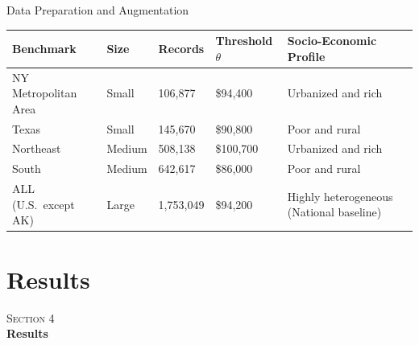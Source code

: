 \documentclass[10pt,aspectratio=169]{beamer}
\begin{document}
\begin{frame}{Data Preparation and Augmentation}
  \centering
  \small
  \begin{tabular}{@{}lllll@{}}
    \toprule
    \textbf{Benchmark} & \textbf{Size} & \textbf{Records} & \textbf{Threshold $\theta$} & \textbf{Socio-Economic Profile} \\
    \midrule
    NY Metropolitan Area   & Small  & 106,877   & \$94{,}400   & Urbanized and rich \\
    Texas                  & Small  & 145,670   & \$90{,}800   & Poor and rural \\
    Northeast              & Medium & 508,138   & \$100{,}700  & Urbanized and rich \\
    South                  & Medium & 642,617   & \$86{,}000   & Poor and rural \\
    ALL (U.S.\ except AK)  & Large  & 1,753,049 & \$94{,}200   & Highly heterogeneous (National baseline) \\
    \bottomrule
  \end{tabular}
\end{frame}

\section{Results}

{
\begin{frame}[plain]
  \centering
  \vfill
  {\color{parthenopeblue}\large\textsc{Section 4}}\\[10pt]
  {\color{parthenopenavy}\Huge\bfseries Results}
  \vfill
\end{frame}}
\end{document}
